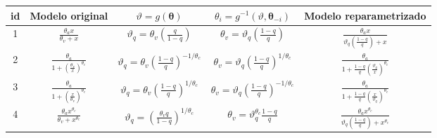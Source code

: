 \begin{tabular*}{\textwidth}{@{\extracolsep{\fill}}ccccc}
\hline 
id &
Modelo original & $\vartheta = g(\boldsymbol{\theta})$ & $\theta_i = g^{-1}(\vartheta, \boldsymbol{\theta}_{-i})$ & Modelo reparametrizado\tabularnewline
\hline 
1 &
$\displaystyle\frac{\theta_a x}{\theta_v+x}$ &
$\displaystyle\vartheta_q = \theta_v\left(\frac{q}{1-q}\right)$ &
$\displaystyle\theta_v = \vartheta_q\left(\frac{1-q}{q}\right)$ &
$\displaystyle\frac{\theta_a x}{\vartheta_q\left(\frac{1-q}{q}\right)+x}$\tabularnewline
2 &
$\displaystyle\frac{\theta_a}{1+\left(\frac{\theta_v}{x}\right)^{\theta_c}}$ &
$\displaystyle\vartheta_q = \theta_v\left(\frac{1-q}{q}\right)^{-1/\theta_c}$ &
$\displaystyle\theta_v = \vartheta_q\left(\frac{1-q}{q}\right)^{1/\theta_c} $ &
$\displaystyle\frac{\theta_a}{1+\frac{1-q}{q}\left(\frac{\vartheta_q}{x}\right)^{\theta_c}}$\tabularnewline
3 &
$\displaystyle\frac{\theta_a}{1+\left(\frac{x}{\theta_v}\right)^{\theta_c}}$ &
$\displaystyle\vartheta_q = \theta_v\left(\frac{1-q}{q}\right)^{1/\theta_c}$ &
$\displaystyle\theta_v = \vartheta_q\left(\frac{1-q}{q}\right)^{-1/\theta_c} $ &
$\displaystyle\frac{\theta_a}{1+\frac{1-q}{q}\left(\frac{x}{\vartheta_q}\right)^{\theta_c}}$\tabularnewline
4 &
$\displaystyle\frac{\theta_a x^{\theta_c}}{\theta_v+x^{\theta_c}}$ &
$\displaystyle\vartheta_q = \left(\frac{\theta_v q}{1-q}\right)^{1/\theta_c}$ &
$\displaystyle\theta_v = \vartheta_q^{\theta_c} \frac{1-q}{q}$ &
$\displaystyle\frac{\theta_a x^{\theta_c}}{\vartheta_q\left(\frac{1-q}{q}\right)+x^{\theta_c}}$\tabularnewline

\end{tabular*}
